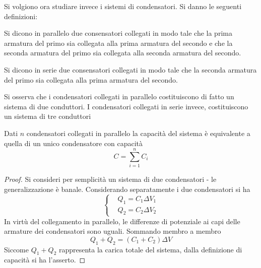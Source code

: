 Si volgiono ora studiare invece i sistemi di condensatori. Si danno le seguenti definizioni:
\begin{defn}
    Si dicono in parallelo due consensatori collegati in modo tale che la prima armatura del primo sia collegata alla prima armatura
    del secondo e che la seconda armatura del primo sia collegata alla seconda armatura del secondo.
\end{defn}

\begin{defn}
    Si dicono in serie due consensatori collegati in modo tale che la seconda armatura del primo sia collegata alla prima armatura del secondo.
\end{defn}

Si osserva che i condensatori collegati in parallelo costituiscono di fatto un sistema di due conduttori. I condensatori collegati in
serie invece, costituiscono un sistema di tre conduttori%
\begin{thm}
    Dati $n$ condensatori collegati in parallelo la capacità del sistema è equivalente a quella di un unico condensatore con capacità
    \[
        C=\sum_{i=1}^n C_i
    \]
\end{thm}
\begin{proof}
    Si consideri per semplicità un sistema di due condensatori - le generalizzazione è banale. Considerando separatamente i due condensatori si ha
    \[
        \begin{cases}
            & Q_1=C_1\Delta V_1 \\
            & Q_2=C_2\Delta V_2
        \end{cases}
    \]
    In virtù del collegamento in parallelo, le differenze di potenziale ai capi delle armature dei condensatori sono uguali. Sommando membro a membro
    \[
        Q_1+Q_2=(C_1+C_2)\Delta V
    \]
    Siccome $Q_1+Q_2$ rappresenta la carica totale del sistema, dalla definizione di capacità si  ha l'asserto.
\end{proof}

